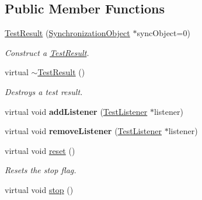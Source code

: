 \subsection*{Public Member Functions}
\begin{DoxyCompactItemize}
\item 
\hypertarget{class_test_result_a51781d20e0edeceae06589f1d9c90b48}{\hyperlink{class_test_result_a51781d20e0edeceae06589f1d9c90b48}{Test\-Result} (\hyperlink{class_synchronized_object_1_1_synchronization_object}{Synchronization\-Object} $\ast$sync\-Object=0)}\label{class_test_result_a51781d20e0edeceae06589f1d9c90b48}

\begin{DoxyCompactList}\small\item\em Construct a \hyperlink{class_test_result}{Test\-Result}. \end{DoxyCompactList}\item 
\hypertarget{class_test_result_a318d2696f70564678f866bad6d5510b6}{virtual \hyperlink{class_test_result_a318d2696f70564678f866bad6d5510b6}{$\sim$\-Test\-Result} ()}\label{class_test_result_a318d2696f70564678f866bad6d5510b6}

\begin{DoxyCompactList}\small\item\em Destroys a test result. \end{DoxyCompactList}\item 
\hypertarget{class_test_result_aaa44db4de1b095eff670e433f12d51de}{virtual void {\bfseries add\-Listener} (\hyperlink{class_test_listener}{Test\-Listener} $\ast$listener)}\label{class_test_result_aaa44db4de1b095eff670e433f12d51de}

\item 
\hypertarget{class_test_result_a695fb70894352cead51d0db8ec59b3e8}{virtual void {\bfseries remove\-Listener} (\hyperlink{class_test_listener}{Test\-Listener} $\ast$listener)}\label{class_test_result_a695fb70894352cead51d0db8ec59b3e8}

\item 
\hypertarget{class_test_result_a5122b5d4edddb4b2d4ea9c214eed8c3f}{virtual void \hyperlink{class_test_result_a5122b5d4edddb4b2d4ea9c214eed8c3f}{reset} ()}\label{class_test_result_a5122b5d4edddb4b2d4ea9c214eed8c3f}

\begin{DoxyCompactList}\small\item\em Resets the stop flag. \end{DoxyCompactList}\item 
\hypertarget{class_test_result_ada481ef1a01dfa7737a1bf019f352855}{virtual void \hyperlink{class_test_result_ada481ef1a01dfa7737a1bf019f352855}{stop} ()}\label{class_test_result_ada481ef1a01dfa7737a1bf019f352855}


\end{DoxyCompactItemize}
